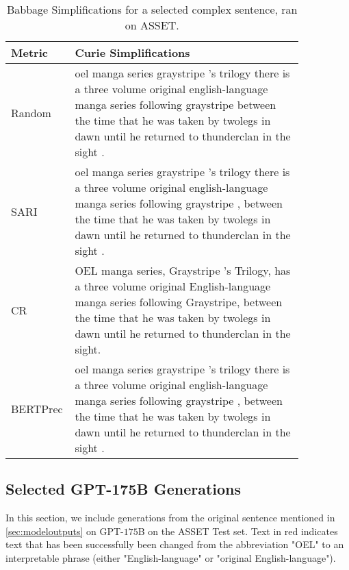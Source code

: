 \documentclass[11pt]{article}
\begin{document}
\begin{table*}[htbp]
            \small  
             \renewcommand{\arraystretch}{1.5}
        \begin{tabular}{p{0.1\linewidth} p{0.75\linewidth}} \toprule
        Metric   & Curie Simplifications \\   \midrule                                                                                                     
        Random   &  oel manga series graystripe 's trilogy there is a three volume original english-language manga series following graystripe between the time that he was taken by twolegs in dawn until he returned to thunderclan in the sight .\\
        \midrule
        SARI   &  oel manga series graystripe 's trilogy there is a three volume original english-language manga series following graystripe , between the time that he was taken by twolegs in dawn until he returned to thunderclan in the sight .\\
        \midrule
        CR   &  OEL manga series, Graystripe 's Trilogy, has a three volume original English-language manga series following Graystripe, between the time that he was taken by twolegs in dawn until he returned to thunderclan in the sight.
\\
        \midrule
        BERTPrec   &  oel manga series graystripe 's trilogy there is a three volume original english-language manga series following graystripe , between the time that he was taken by twolegs in dawn until he returned to thunderclan in the sight .\\ 
        \bottomrule
        \end{tabular}
        \caption{Babbage Simplifications for a selected complex sentence, ran on ASSET.} 
        \label{tab:babbage}
    \end{table*}


\subsection{Selected GPT-175B Generations}
\label{ssec:dv3asset}
In this section, we include generations from the original sentence mentioned in \ref{sec:modeloutputs} on GPT-$175$B on the ASSET Test set. Text in \textcolor{Mycolor3}{red} indicates text that has been successfully been changed from the abbreviation "OEL" to an interpretable phrase (either "English-language" or "original English-language"). 
\end{document}
